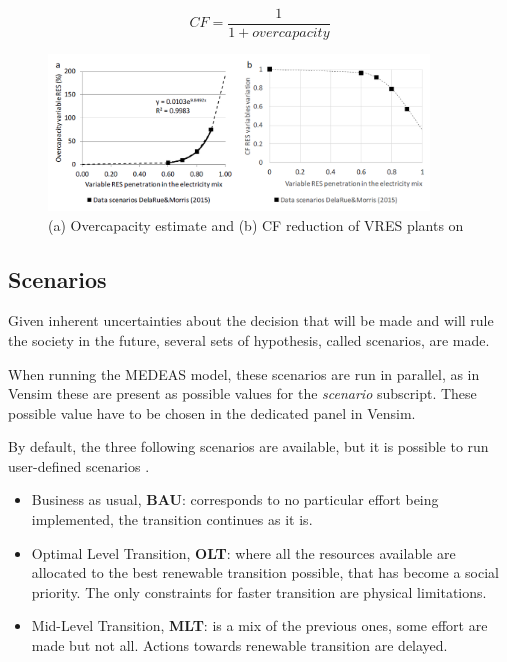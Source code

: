 \begin{equation}
    CF=\frac{1}{1+overcapacity}
    \label{equation:CF}
\end{equation}

\begin{figure}[h]
    \includegraphics[width=0.9\textwidth]{resources/images/vres-impact-estimate.png}
    \caption{(a) Overcapacity estimate and (b) CF reduction of VRES plants on \cite{medeas-eroi}}
    \label{fig:vres-overcapacities}
\end{figure}

\subsection{Scenarios} \label{section:medeas-scenarios}

Given inherent uncertainties about the decision that will be made and will rule the society in the future, several sets of hypothesis, called scenarios, are made.

When running the MEDEAS model, these scenarios are run in parallel, as in Vensim these are present as possible values for the \textit{scenario} subscript. These possible value have to be chosen in the dedicated panel in Vensim.

By default, the three following scenarios are available, but it is possible to run user-defined scenarios \cite{medeas-website}.

\begin{itemize}
    \item Business as usual, \textbf{BAU}: corresponds to no particular effort being implemented, the transition continues as it is.
    \item Optimal Level Transition, \textbf{OLT}: where all the resources available are allocated to the best renewable transition possible, that has become a social priority. The only constraints for faster transition are physical limitations.
    \item Mid-Level Transition, \textbf{MLT}: is a mix of the previous ones, some effort are made but not all. Actions towards renewable transition are delayed.
\end{itemize}

